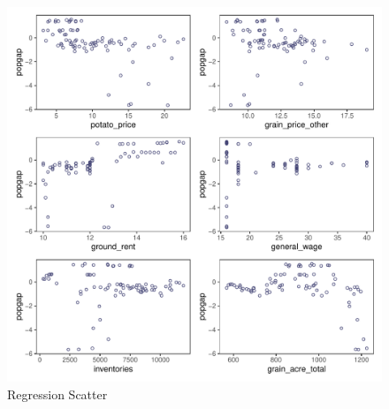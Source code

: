 \begin{figure}[htbp]
    \centering
    \caption{Regression Scatter}
    \includegraphics[width=.95\textwidth]{../03_outputs/regression_scatter.pdf}
\end{figure}










